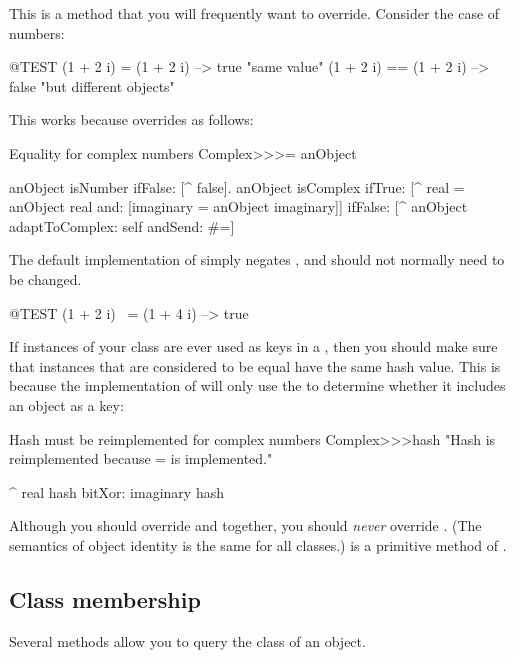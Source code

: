 \documentclass[a4paper,10pt,twoside]{book}
\begin{document}
This is a method that you will frequently want to override.
Consider the case of  numbers:

\begin{code}{@TEST}
(1 + 2 i) = (1 + 2 i)   --> true     "same value"
(1 + 2 i) == (1 + 2 i) --> false    "but different objects"
\end{code}

This works because  overrides \ct{=} as follows:
\begin{method}{Equality for complex numbers}
Complex>>>= anObject

	anObject isNumber ifFalse: [^ false].
	anObject isComplex
		ifTrue: [^ real = anObject real and: [imaginary = anObject imaginary]]
		ifFalse: [^ anObject adaptToComplex: self andSend: #=]
\end{method}

The default implementation of  simply negates , and should not normally need to be changed.

\begin{code}{@TEST}
(1 + 2 i) ~= (1 + 4 i) --> true
\end{code}


If instances of your class are ever used as keys in a , then you should make sure that instances that are considered to be equal have the same hash value. This is because the implementation of  will only use the  to determine whether it includes an object as a key:
\begin{method}{Hash must be reimplemented for complex numbers}
Complex>>>hash
    "Hash is reimplemented because = is implemented."

    ^ real hash bitXor: imaginary hash
\end{method}

Although you should override \ct{=} and  together, you should \emph{never} override \ct{==}.
(The semantics of object identity is the same for all classes.)
\ct{==} is a primitive method of .


\subsection{Class membership}
Several methods allow you to query the class of an object. 
\end{document}
